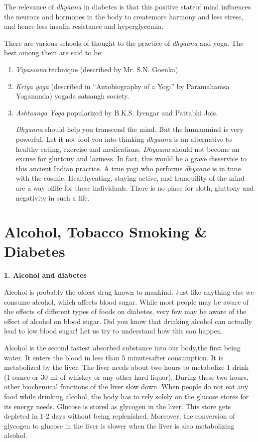 The relevance of \textit{dhyaana} in diabetes is that this positive state\break of mind influences the neurons and hormones in the body to create\break more harmony and less stress, and hence less insulin resistance and hyperglycemia.

There are various schools of thought to the practice of \textit{dhyaana} and yoga. The best among them are said to be:

\vspace{-\topsep}
\begin{enumerate}[•]
\itemsep=0pt
\item \textit{Vipassana} technique (described by Mr. S.N. Goenka).
\item \textit{Kriya yoga} (described in “Autobiography of a Yogi” by Paramahamsa Yogananda) yogada satsangh society.
\item \textit{Ashtaanga Yoga} popularized by B.K.S. Iyengar and Pattabhi Jois.

\textit{Dhyaana} should help you transcend the mind. But the human\break mind is very powerful. Let it not fool you into thinking \textit{dhyaana} is an alternative to healthy eating, exercise and medications. \textit{Dhyaana} should not become an excuse for gluttony and laziness. In fact, this would be a grave disservice to this ancient Indian practice. A true yogi who performs \textit{dhyaana} is in tune with the cosmic. Healthy\break eating, staying active, and tranquility of the mind are a way of\break life for these indi\-viduals. There is no place for sloth, gluttony and negativity in such a life.
\end{enumerate}


\chapter{Alcohol, Tobacco Smoking \& Diabetes}\label{chap28}

\vspace{-\topsep}
{\noindent\Large\textbf{1. Alcohol and diabetes}}

Alcohol is probably the oldest drug known to mankind. Just like anything else we consume alcohol, which affects blood sugar. While most people may be aware of the effects of different types of foods on diabetes, very few may be aware of the effect of alcohol on blood sugar. Did you know that drinking alcohol can actually lead to low blood sugar! Let us try to understand how this can happen.

Alcohol is the second fastest absorbed substance into our body,\break the first being water. It enters the blood in less than 5 minutes\break after consumption. It is metabolized by the liver. The liver needs about two hours to metabolize 1 drink (1 ounce or 30 ml of whiskey or any other hard liquor). During these two hours, other biochemical functions of the liver slow down. When people do not eat any food while drinking alcohol, the body has to rely solely on the glucose stores for its energy needs. Glucose is stored as glycogen in the liver. This store gets depleted in 1-2 days without being replenished. Moreover, the conversion of glycogen to glucose in the liver is slower when the liver is also metabolizing alcohol.

